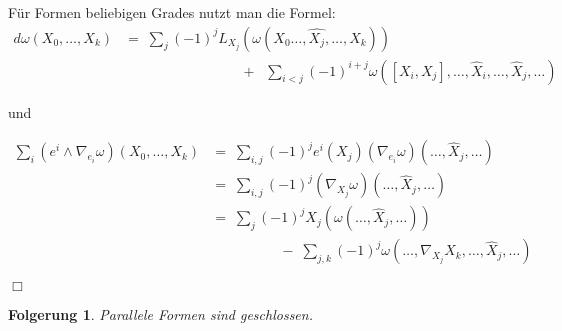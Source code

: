\documentclass[12pt,a4paper]{article}
\newtheorem{Folgerung}[Lemma]{Folgerung}
\def\qed{\quad\hfill\ensuremath{\Box}}
\begin{document}
\medskip

F\"ur Formen beliebigen Grades nutzt man die Formel:
$$
\begin{array}{rl}
d\omega (X_0, \ldots, X_k)
& =\;
\sum_j (-1)^j L_{X_j}(\omega(X_0 \ldots, \hat{X_j},\ldots, X_k) )\\[1.5ex]
& \phantom{xxxxxxxxxxxxxx}\;+\;\;
\sum_{i<j}(-1)^{i+j} \omega([X_i, X_j],\ldots, \hat X_i, \ldots, \hat X_j, \ldots)
\end{array}
$$

und 

$$
\begin{array}{rl}
\sum_i (e^i \wedge \nabla_{e_i} \omega)(X_0, \ldots, X_k)
& = \;
\sum_{i, j} (-1)^j e^i(X_j)(\nabla_{e_i}\omega)(\ldots, \hat X_j, \ldots) \\[1.5ex]
& = \;
\sum_{i, j}(-1)^j (\nabla_{X_j}\omega)(\ldots, \hat X_j, \ldots)\\[1.5ex]
& = \;
\sum_{j} (-1)^j X_j(\omega(\ldots, \hat X_j, \ldots)) \\[1ex] 
& \phantom{xxxxxxxx} \;-\; \sum_{j,k} (-1)^j \omega(\ldots, \nabla_{X_j}X_k, \ldots, \hat X_j, \ldots)
\end{array}
$$


\qed

\bigskip

\begin{Folgerung}
 Parallele Formen sind geschlossen.
\end{Folgerung}


\bigskip
\end{document}
